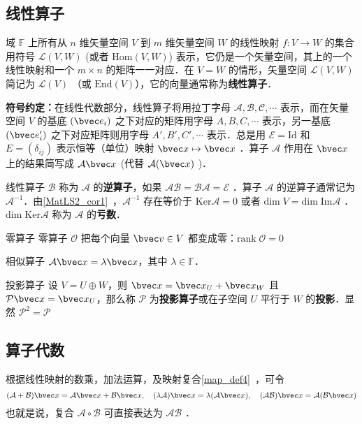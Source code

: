 
\subsection{线性算子}
域 $\mathbb{F}$ 上所有从 $n$ 维矢量空间 $V$ 到 $m$ 维矢量空间 $W$ 的线性映射 $f:V\rightarrow W$ 的集合用符号 $\mathcal{L}(V,W)$ (或者 $\mathrm{Hom}(V,W)$) 表示，它仍是一个矢量空间，其上的一个线性映射和一个 $m\times n$ 的矩阵一一对应．在 $V=W$ 的情形，矢量空间 $\mathcal{L}(V,W)$ 简记为 $\mathcal{L}(V)$ （或 $\mathrm{End}(V)$），它的向量通常称为\textbf{线性算子}．

\textbf{符号约定：}在线性代数部分，线性算子将用拉丁字母 $\mathcal{A,B,C,\cdots}$ 表示，而在矢量空间 $V$ 的基底 $(\bvec e_i)$ 之下对应的矩阵用字母 $A,B,C,\cdots$ 表示，另一基底 $(\bvec e_i')$ 之下对应矩阵则用字母 $A',B',C',\cdots$ 表示．总是用 $\mathcal{E}=\mathrm{Id}$ 和 $E=(\delta_{ij})$ 表示恒等（单位）映射 $\bvec x\mapsto \bvec x$ ．算子 $\mathcal{A}$ 作用在 $\bvec x$ 上的结果简写成 $\mathcal{A}\bvec x$ (代替 $\mathcal{A}(\bvec x)$ )．

线性算子 $\mathcal{B}$ 称为 $\mathcal{A}$ 的\textbf{逆算子}，如果 $\mathcal{AB}=\mathcal{BA}=\mathcal{E}$ ．算子 $\mathcal{A}$ 的逆算子通常记为 $\mathcal{A}^{-1}$．由\autoref{MatLS2_cor1}~，$\mathcal{A}^{-1}$ 存在等价于 $\mathrm{Ker}\mathcal{A}=0$ 或者 $\mathrm{dim}\;V=\mathrm{dim\;Im}\mathcal{A}$ ．$\mathrm{dim\;Ker}\mathcal{A}$ 称为 $\mathcal{A}$ 的\textbf{亏数}．
\begin{example}{零算子}
零算子 $\mathcal{O}$ 把每个向量 $\bvec v\in V$ 都变成零：$\mathrm{rank}\; \mathcal{O}=0$
\end{example}
\begin{example}{相似算子}
$\mathcal{A}\bvec x=\lambda\bvec x$，其中 $\lambda\in\mathbb{F}$．
\end{example}
\begin{example}{投影算子}
设 $V=U\oplus W$，则 $\bvec x=\bvec x_U+\bvec x_W$ 且 $\mathcal{P}\bvec x=\bvec x_U$，那么称 $\mathcal{P}$ 为\textbf{投影算子}或在子空间 $U$ 平行于 $W$ 的\textbf{投影}．显然 $\mathcal{P}^2=\mathcal{P}$
\end{example}
\subsection{算子代数}
根据线性映射的数乘，加法运算，及映射复合\autoref{map_def4}~，可令
\begin{equation}\label{LiOper_eq1}
(\mathcal{A}+\mathcal{B})\bvec x=\mathcal{A}\bvec x+\mathcal{B}\bvec x,\quad (\lambda\mathcal A)\bvec x=\lambda(\mathcal A\bvec x),\quad (\mathcal{AB})\bvec x=\mathcal{A}(\mathcal{B}\bvec x)
\end{equation}
也就是说，复合 $\mathcal{A\circ B}$ 可直接表达为 $\mathcal{AB}$ ．

